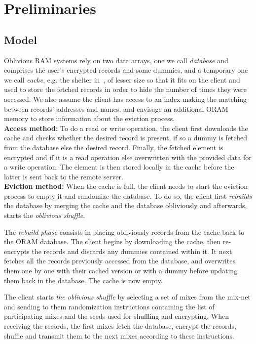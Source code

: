 \documentclass[USenglish,oneside,twocolumn]{article}
\begin{document}
\section{Preliminaries}\label{Prelim}
%
\subsection{Model}\label{Model}

Oblivious RAM systems rely on two data arrays, one we call \emph{database} and comprises the user's encrypted records and some dummies, and a temporary one we call \emph{cache}, e.g. the shelter in~\cite{goldreich87}, of lesser size so that it fits on the client and used to store the fetched records in order to hide the number of times they were accessed. We also assume the client has access to an index making the matching between records' addresses and names, and envisage an additional ORAM memory to store information about the eviction process.\\

\noindent\textbf{Access method:} To do a read or write operation, the client first downloads the cache and checks whether the desired record is present, if so a dummy is fetched from the database else the desired record. Finally, the fetched element is encrypted and if it is a read operation else overwritten with the provided data for a write operation. The element is then stored locally in the cache before the latter is sent back to the remote server.\\

\noindent\textbf{Eviction method:} When the cache is full, the client needs to start the eviction process to empty it and randomize the database. To do so, the client first \textit{rebuilds} the database by merging the cache and the database obliviously and afterwards, starts the \textit{oblivious shuffle}.

\noindent The \emph{rebuild phase} consists in placing obliviously records from the cache back to the ORAM database. The client begins by downloading the cache, then re-encrypts the records and discards any dummies contained within it. It next fetches all the records previously accessed from the database, and overwrites them one by one with their cached version or with a dummy before updating them back in the database. The cache is now empty.

\noindent The client starts \emph{the oblivious shuffle} by selecting a set of mixes from the mix-net and sending to them randomization instructions containing the list of participating mixes and the seeds used for shuffling and encrypting. When receiving the records, the first mixes fetch the database, encrypt the records, shuffle and transmit them to the next mixes according to these instructions.
\end{document}
